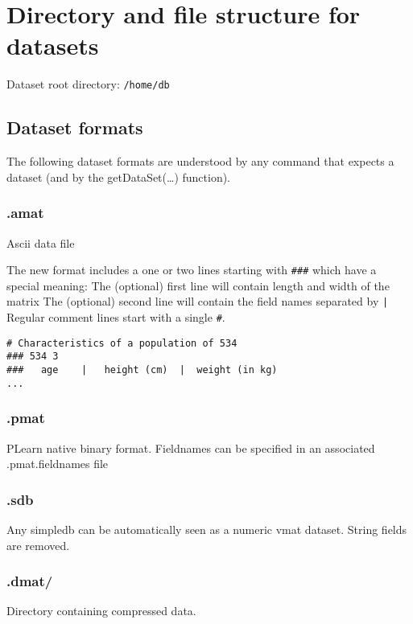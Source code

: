 \documentclass[11pt]{book}
\begin{document}
\section{Directory and file structure for datasets}

Dataset root directory:
{\tt /home/db}

\subsection{Dataset formats}

The following dataset formats are understood by any command that expects a dataset (and by the getDataSet(\ldots) function).

\subsubsection{.amat}

Ascii data file

The new format includes a one or two lines starting with \verb!###! which have a special meaning:  
The (optional) first line will contain length and width of the matrix
The (optional) second line will contain the field names separated by \verb!|!
Regular comment lines start with a single \verb!#!.

\begin{verbatim}
# Characteristics of a population of 534
### 534 3
###   age    |   height (cm)  |  weight (in kg) 
...
\end{verbatim}

\subsubsection{.pmat}

PLearn native binary format.
Fieldnames can be specified in an associated .pmat.fieldnames file

\subsubsection{.sdb}

Any simpledb can be automatically seen as a numeric vmat dataset. 
String fields are removed.

\subsubsection{.dmat/}

Directory containing compressed data.
\end{document}
